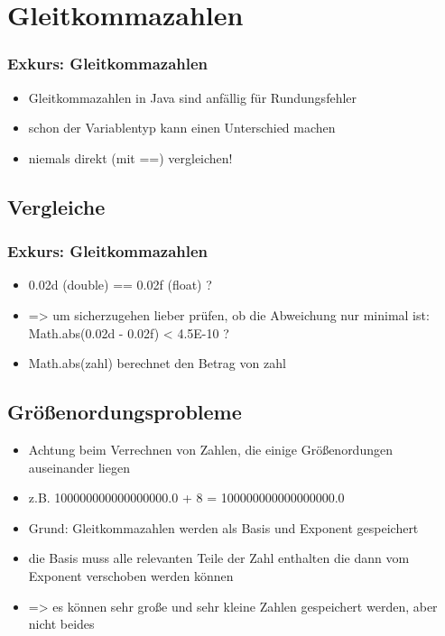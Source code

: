 \documentclass[final]{beamer}
\begin{document}
\section{Gleitkommazahlen}
\begin{frame}
	\frametitle{Exkurs: Gleitkommazahlen}
	\begin{itemize}
		\item{Gleitkommazahlen in Java sind anfällig für Rundungsfehler}
		\item{schon der Variablentyp kann einen Unterschied machen}
		\item{niemals direkt (mit ==) vergleichen!}
	\end{itemize}
\end{frame}

\subsection{Vergleiche}
\begin{frame}
	\frametitle{Exkurs: Gleitkommazahlen}
	\begin{itemize}
		\item{0.02d (double) == 0.02f (float) ?}
		\item{=> um sicherzugehen lieber prüfen, ob die Abweichung nur minimal ist: \\
		Math.abs(0.02d - 0.02f) < 4.5E-10 ?}
		\item{Math.abs(zahl) berechnet den Betrag von zahl}
	\end{itemize}
\end{frame}

\subsection{Größenordungsprobleme}
\begin{frame}
	\begin{itemize}
		\item{Achtung beim Verrechnen von Zahlen, die einige Größenordungen auseinander liegen}
		\item{z.B. 100000000000000000.0 + 8 = 100000000000000000.0}
		\item{Grund: Gleitkommazahlen werden als Basis und Exponent gespeichert}
		\item{die Basis muss alle relevanten Teile der Zahl enthalten die dann vom Exponent verschoben werden können}
		\item{=> es können sehr große und sehr kleine Zahlen gespeichert werden, aber nicht beides}
	\end{itemize}
\end{frame}
\end{document}
